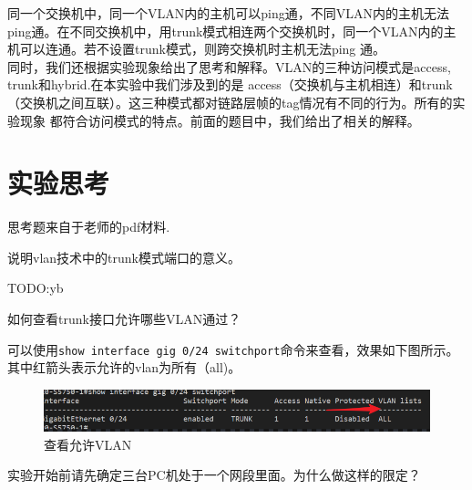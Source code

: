 \documentclass{myreport}
\begin{document}
同一个交换机中，同一个VLAN内的主机可以ping通，不同VLAN内的主机无法
ping通。在不同交换机中，用trunk模式相连两个交换机时，同一个VLAN内的主机可以连通。若不设置trunk模式，则跨交换机时主机无法ping
通。\\ 

同时，我们还根据实验现象给出了思考和解释。VLAN的三种访问模式是access, trunk和hybrid.在本实验中我们涉及到的是
access（交换机与主机相连）和trunk（交换机之间互联）。这三种模式都对链路层帧的tag情况有不同的行为。所有的实验现象
都符合访问模式的特点。前面的题目中，我们给出了相关的解释。
\section{实验思考}

思考题来自于老师的pdf材料.

\begin{tcolorbox}[title = {思考题一}]
说明vlan技术中的trunk模式端口的意义。
\end{tcolorbox}

TODO:yb

\begin{tcolorbox}[title = {思考题二}]
如何查看trunk接口允许哪些VLAN通过？
\end{tcolorbox}

可以使用\texttt{show interface gig 0/24 switchport}命令来查看，效果如下图所示。其中红箭头表示允许的vlan为所有（all)。


\begin{figure}[htp]
    \centering
    \includegraphics[width=13cm]{"./figure/2018-05-18-02-31-27.png
    "}
    \caption{查看允许VLAN}
    \label{fig:e1-t2}
\end{figure}


\begin{tcolorbox}[title = {思考题三}]
实验开始前请先确定三台PC机处于一个网段里面。为什么做这样的限定？
\end{tcolorbox}
\end{document}
